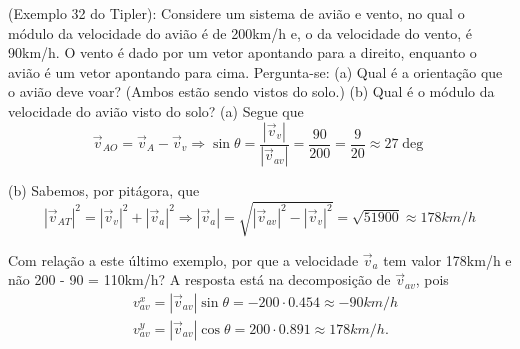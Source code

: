 \documentclass[PhysicsI/physics_notes.tex]{subfiles}
\begin{document}
\begin{example}
	(Exemplo 32 do Tipler): Considere um sistema de avião e vento, no qual o módulo da velocidade do avião é de 200km/h e,
	o da velocidade do vento, é 90km/h. O vento é dado por um vetor apontando para a direito, enquanto o avião é um vetor apontando para cima.
	Pergunta-se: (a) Qual é a orientação que o avião deve voar? (Ambos estão sendo vistos do solo.) (b) Qual é o módulo da
	velocidade do avião visto do solo?
	(a) Segue que
	$$
		\vec{v}_{AO} = \vec{v}_{A} - \vec{v}_{v} \Rightarrow \sin{\theta} = \frac{|\vec{v}_{v}|}{|\vec{v}_{av}|} = \frac{90}{200} = \frac{9}{20}\approx 27\deg
	$$

	(b) Sabemos, por pitágora, que
	$$
		|\vec{v}_{AT}|^{2} = |\vec{v}_{v}|^{2} + |\vec{v}_{a}|^{2} \Rightarrow |\vec{v}_{a}| = \sqrt{|\vec{v}_{av}|^{2} - |\vec{v}_{v}|^{2}} = \sqrt{51900}\approx 178km/h
	$$
\end{example}
Com relação a este último exemplo, por que a velocidade $\vec{v}_{a}$ tem valor 178km/h e não 200 - 90 = 110km/h?
A resposta está na decomposição de $\vec{v}_{av}$, pois
\begin{align*}
	 & v_{av}^{x} = |\vec{v}_{av}|\sin{\theta} = -200 \cdot 0.454\approx -90km/h \\
	 & v_{av}^{y} = |\vec{v}_{av}|\cos{\theta} = 200 \cdot 0.891\approx 178km/h.
\end{align*}
\end{document}
